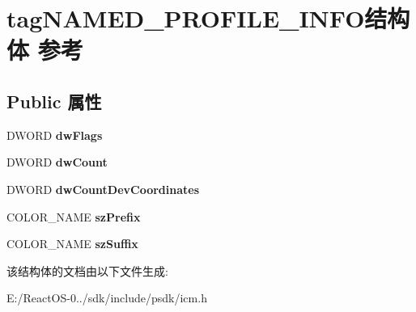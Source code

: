 \hypertarget{structtag_n_a_m_e_d___p_r_o_f_i_l_e___i_n_f_o}{}\section{tag\+N\+A\+M\+E\+D\+\_\+\+P\+R\+O\+F\+I\+L\+E\+\_\+\+I\+N\+F\+O结构体 参考}
\label{structtag_n_a_m_e_d___p_r_o_f_i_l_e___i_n_f_o}
\subsection*{Public 属性}
\begin{DoxyCompactItemize}
\item 
\mbox{\label{structtag_n_a_m_e_d___p_r_o_f_i_l_e___i_n_f_o_a0f96505e262ad3555f7ca07782ab7863}} 
D\+W\+O\+RD {\bfseries dw\+Flags}
\item 
\mbox{\label{structtag_n_a_m_e_d___p_r_o_f_i_l_e___i_n_f_o_aa64bf92dbe9b95ac73ddc9aa962828fb}} 
D\+W\+O\+RD {\bfseries dw\+Count}
\item 
\mbox{\label{structtag_n_a_m_e_d___p_r_o_f_i_l_e___i_n_f_o_a375a5a9027408ed93231bffaf164bdae}} 
D\+W\+O\+RD {\bfseries dw\+Count\+Dev\+Coordinates}
\item 
\mbox{\label{structtag_n_a_m_e_d___p_r_o_f_i_l_e___i_n_f_o_af4f4dab6ebbae2747afb1c4fc1c6b563}} 
C\+O\+L\+O\+R\+\_\+\+N\+A\+ME {\bfseries sz\+Prefix}
\item 
\mbox{\label{structtag_n_a_m_e_d___p_r_o_f_i_l_e___i_n_f_o_a20842987ece0ccc17c6d151a2a148bc7}} 
C\+O\+L\+O\+R\+\_\+\+N\+A\+ME {\bfseries sz\+Suffix}
\end{DoxyCompactItemize}


该结构体的文档由以下文件生成\+:\begin{DoxyCompactItemize}
\item 
E\+:/\+React\+O\+S-\/0../sdk/include/psdk/icm.\+h\end{DoxyCompactItemize}
